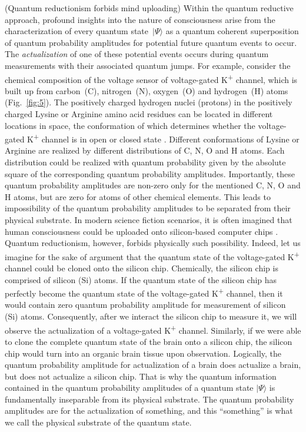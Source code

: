 \documentclass{ws-ijmpb}
\begin{document}
\begin{example}
(Quantum reductionism forbids mind uploading) Within the quantum reductive approach,
profound insights into the nature of consciousness arise from the characterization
of every quantum state~$\vert \Psi\rangle$ as a quantum coherent superposition
of quantum probability amplitudes for potential future quantum events to occur.
The \emph{actualization} of one of these potential events occurs
during quantum measurements with their associated quantum jumps. For
example, consider the chemical composition of the voltage sensor of
voltage-gated K\textsuperscript{+} channel, which is built up from
carbon~(C), nitrogen~(N), oxygen~(O) and hydrogen~(H) atoms \cite{Kariev2014,Kariev2018,Kariev2021} (Fig.~\ref{fig:5}).
The positively charged hydrogen nuclei (protons) in the positively
charged Lysine or Arginine amino acid residues can be located in different
locations in space, the conformation of which determines whether the
voltage-gated K\textsuperscript{+} channel is in open or closed state \cite{Sansom2000,Catterall2010,Islas2016}.
Different conformations of Lysine or Arginine are realized by different
distributions of C, N, O and H atoms. Each distribution could be realized
with quantum probability given by the absolute square of the corresponding
quantum probability amplitudes. Importantly, these quantum probability
amplitudes are non-zero only for the mentioned C, N, O and H atoms,
but are zero for atoms of other chemical elements.
This leads to impossibility
of the quantum probability amplitudes to be separated from their physical
substrate. In modern science fiction scenarios, it is often imagined
that human consciousness could be uploaded onto silicon-based computer
chips \cite{Bamford2012,Choe2012,Depp2014,Cappuccio2017}.
Quantum reductionism, however, forbids physically such possibility. Indeed, let us imagine
for the sake of argument that the quantum state of the voltage-gated
K\textsuperscript{+} channel could be cloned onto the silicon chip.
Chemically, the silicon chip is comprised of silicon (Si) atoms. If
the quantum state of the silicon chip has perfectly become the quantum
state of the voltage-gated K\textsuperscript{+} channel, then it
would contain zero quantum probability amplitude for measurement of
silicon (Si) atoms. Consequently, after we interact the silicon chip
to measure it, we will observe the actualization of a voltage-gated
K\textsuperscript{+} channel. Similarly, if
we were able to clone the complete quantum state of the brain onto
a silicon chip, the silicon chip would turn into an organic brain
tissue upon observation. Logically, the quantum probability amplitude
for actualization of a brain does actualize a brain, but does not
actualize a silicon chip. That is why the quantum information contained
in the quantum probability amplitudes of a quantum state $\vert \Psi\rangle$
is fundamentally inseparable from its physical substrate. The quantum
probability amplitudes are for the actualization of something, and
this ``something'' is what we call the physical substrate
of the quantum state.
\end{example}
\end{document}
